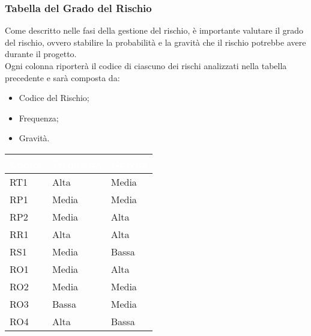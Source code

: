 \clearpage

\subsubsection{Tabella del Grado del Rischio}
Come descritto nelle fasi della gestione del rischio, è importante valutare il grado del rischio, ovvero stabilire la probabilità e la gravità che il rischio potrebbe avere durante il progetto.\\
Ogni colonna riporterà il codice di ciascuno dei rischi analizzati nella tabella precedente e sarà composta da:
\begin{itemize}
	\item Codice del Rischio;
	\item Frequenza;
	\item Gravità.
\end{itemize}

{
\renewcommand{\arraystretch}{2}
\centering
	
\begin{longtable}{C{2cm} C{3cm} C{3cm}}
	\textcolor{white}{\textbf{Codice}} & 
	\textcolor{white}{\textbf{Frequenza}} & 
	\textcolor{white}{\textbf{Gravità}}\\	
\endhead
		
		RT1 & Alta & Media\\
		
		RP1 & Media & Media\\
		
		RP2 & Media & Alta\\
		
		RR1 & Alta & Alta\\
		
		RS1 & Media & Bassa\\
		
		RO1 & Media & Alta\\
		
		RO2 & Media & Media\\
		
		RO3 & Bassa & Media\\
		
		RO4 & Alta & Bassa\\
		
	
	\end{longtable}
	
}

